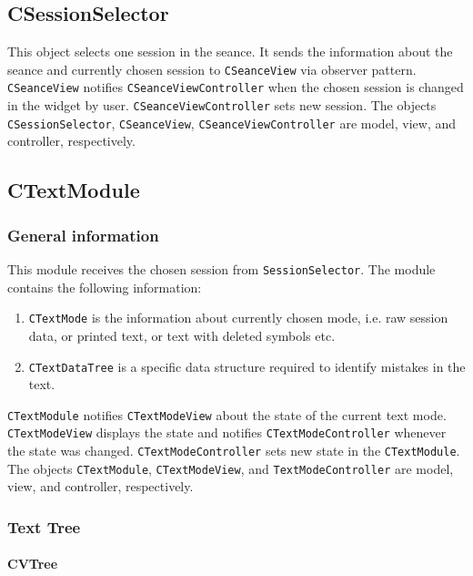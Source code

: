 \documentclass{article}
\begin{document}
\subsection{CSessionSelector}

This object selects one session in the seance. It sends the information about the seance and currently chosen session to \verb"CSeanceView" via observer pattern. \verb"CSeanceView" notifies \verb"CSeanceViewController" when the chosen session is changed in the widget by user. \verb"CSeanceViewController" sets new session. The objects \verb"CSessionSelector", \verb"CSeanceView", \verb"CSeanceViewController" are model, view, and controller, respectively.

\subsection{CTextModule}

\subsubsection{General information}

This module receives the chosen session from \verb"SessionSelector". The module contains the following information:
\begin{enumerate}
\item \verb"CTextMode" is the information about currently chosen mode, i.e. raw session data, or printed text, or text with deleted symbols etc.
\item \verb"CTextDataTree" is a specific data structure required to identify mistakes in the text.
\end{enumerate}

\verb"CTextModule" notifies \verb"CTextModeView" about the state of the current text mode. \verb"CTextModeView" displays the state and notifies \verb"CTextModeController" whenever the state was changed. \verb"CTextModeController" sets new state in the \verb"CTextModule". The objects \verb"CTextModule", \verb"CTextModeView", and \verb"TextModeController" are model, view, and controller, respectively.

\subsubsection{Text Tree}

\paragraph{CVTree}
\end{document}
